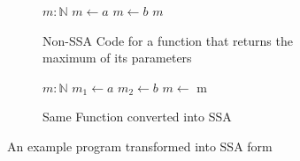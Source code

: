 \begin{figure}[h]
    \begin{subfigure}[b]{0.5\textwidth}
        \centering
        \begin{algorithmic}
            \State $m: \mathbb{N}$
            \State $m \gets a$
            \Else
            \State $m \gets b$
            \EndIf
            \State \Return $m$
            \EndFunction
        \end{algorithmic}
        \subfigfill
        \caption{Non-SSA Code for a function that returns the maximum of its parameters}
    \end{subfigure}
    \begin{subfigure}[b]{0.5\textwidth}
        \centering
        \begin{algorithmic}
            \State $m: \mathbb{N}$
            \State $m_1 \gets a$
            \Else
            \State $m_2 \gets b$
            \EndIf
            \State $m \gets$ 
            \State \Return m
            \EndFunction
        \end{algorithmic}
        \subfigfill
        \caption{Same Function converted into SSA}
    \end{subfigure}
    \caption{An example program transformed into SSA form}
    \label{fig:basics:SSA-phi}
\end{figure}